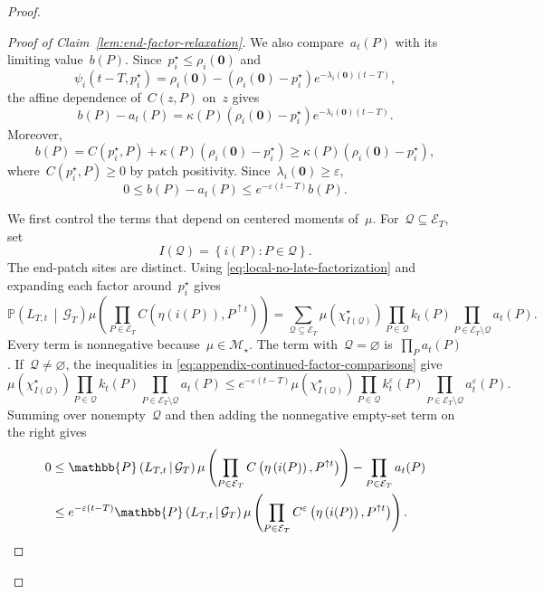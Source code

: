 \documentclass[EJP,preprint,NODS,nobera]{ejpecp}
\newcommand{\pP}{\mathbb{P}}
\newcommand{\CP}[2]{\pP\bb{#1\,\middle|\,#2}}
\newcommand{\bb}[1]{\left(#1\right)}
\newcommand{\cb}[1]{\left\{#1\right\}}
\newcommand{\mb}[1]{\mathbf{#1}}
\begin{document}
\begin{proof}
\begin{proof}[Proof of Claim~\ref{lem:end-factor-relaxation}]
We also compare~$a_t(P)$ with its limiting value~$b(P)$. Since~$p_i^\star\leq\rho_i(\mb 0)$ and
\begin{equation*}
\psi_i(t-T,p_i^\star)
=
\rho_i(\mb 0)
-
\bb{\rho_i(\mb 0)-p_i^\star}
e^{-\lambda_i(\mb 0)(t-T)},
\end{equation*}
the affine dependence of~$C(z,P)$ on~$z$ gives
\begin{equation*}
b(P)-a_t(P)
=
\kappa(P)\bb{\rho_i(\mb 0)-p_i^\star}
e^{-\lambda_i(\mb 0)(t-T)}.
\end{equation*}
Moreover,
\begin{equation*}
b(P)
=
C\bb{p_i^\star,P}
+
\kappa(P)\bb{\rho_i(\mb 0)-p_i^\star}
\geq
\kappa(P)\bb{\rho_i(\mb 0)-p_i^\star},
\end{equation*}
where~$C(p_i^\star,P)\geq0$ by patch positivity. Since~$\lambda_i(\mb 0)\geq\varepsilon$,
\begin{equation}
\label{eq:continued-end-factor-limit-comparison}
0
\leq
b(P)-a_t(P)
\leq
e^{-\varepsilon(t-T)}b(P).
\end{equation}

We first control the terms that depend on centered moments of~$\mu$. For~$\mathcal Q\subseteq\mathcal E_T$, set
\begin{equation*}
I(\mathcal Q)
=
\cb{i(P):P\in\mathcal Q}.
\end{equation*}
The end-patch sites are distinct. Using
\eqref{eq:local-no-late-factorization} and expanding each factor around~$p_i^\star$ gives
\begin{equation}
\CP{L_{T,t}}{\mathcal G_T}
\mu\bb{
 \prod_{P\in\mathcal E_T}
 C\bb{\eta\bb{i(P)},P^{\uparrow t}}
}
=
\sum_{\mathcal Q\subseteq\mathcal E_T}
\mu\bb{\chi_{I(\mathcal Q)}^\star}
\prod_{P\in\mathcal Q}k_t(P)
\prod_{P\in\mathcal E_T\setminus\mathcal Q}a_t(P).
\label{eq:continued-end-factor-centered-expansion}
\end{equation}
Every term is nonnegative because~$\mu\in\mathcal M_\star$. The term with~$\mathcal Q=\varnothing$ is~$\prod_Pa_t(P)$. If~$\mathcal Q\neq\varnothing$, the inequalities in
\eqref{eq:appendix-continued-factor-comparisons} give
\begin{equation*}
\mu\bb{\chi_{I(\mathcal Q)}^\star}
\prod_{P\in\mathcal Q}k_t(P)
\prod_{P\in\mathcal E_T\setminus\mathcal Q}a_t(P)
\leq
e^{-\varepsilon(t-T)}
\mu\bb{\chi_{I(\mathcal Q)}^\star}
\prod_{P\in\mathcal Q}k_t^\varepsilon(P)
\prod_{P\in\mathcal E_T\setminus\mathcal Q}a_t^\varepsilon(P).
\end{equation*}
Summing over nonempty~$\mathcal Q$ and then adding the nonnegative empty-set
term on the right gives
\begin{align}
0
&\leq
\CP{L_{T,t}}{\mathcal G_T}
\mu\bb{
 \prod_{P\in\mathcal E_T}
 C\bb{\eta\bb{i(P)},P^{\uparrow t}}
}
-
\prod_{P\in\mathcal E_T}a_t(P)
\notag\\
&\leq
e^{-\varepsilon(t-T)}
\CP{L_{T,t}}{\mathcal G_T}
\mu\bb{
 \prod_{P\in\mathcal E_T}
 C^\varepsilon\bb{\eta\bb{i(P)},P^{\uparrow t}}
}.
\label{eq:continued-end-factor-centered-error}
\end{align}


\end{proof}
\end{proof}
\end{document}
